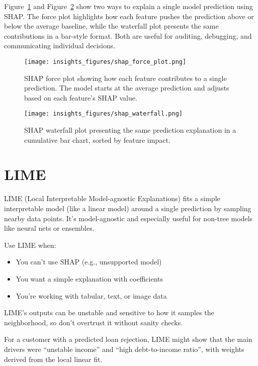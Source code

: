 \documentclass[12pt,openany, draft]{book}
\begin{document}
Figure~\ref{fig:shap-force} and Figure~\ref{fig:shap-waterfall} show two ways to explain a single model prediction using SHAP. The force plot highlights how each feature pushes the prediction above or below the average baseline, while the waterfall plot presents the same contributions in a bar-style format. Both are useful for auditing, debugging, and communicating individual decisions.

\begin{figure}[H]
    \centering
    \texttt{[image: insights\_figures/shap\_force\_plot.png]}
    \caption{SHAP force plot showing how each feature contributes to a single prediction. The model starts at the average prediction and adjusts based on each feature’s SHAP value.}
    \label{fig:shap-force}
\end{figure}

\begin{figure}[H]
    \centering
    \texttt{[image: insights\_figures/shap\_waterfall.png]}
    \caption{SHAP waterfall plot presenting the same prediction explanation in a cumulative bar chart, sorted by feature impact.}
    \label{fig:shap-waterfall}
\end{figure}



\section{LIME}

LIME (Local Interpretable Model-agnostic Explanations) fits a simple interpretable model (like a linear model) around a single prediction by sampling nearby data points. It’s model-agnostic and especially useful for non-tree models like neural nets or ensembles.

Use LIME when:
\begin{itemize}
  \item You can’t use SHAP (e.g., unsupported model)
  \item You want a simple explanation with coefficients
  \item You’re working with tabular, text, or image data
\end{itemize}

\begin{notebox}
LIME’s outputs can be unstable and sensitive to how it samples the neighborhood, so don’t overtrust it without sanity checks.
\end{notebox}

\begin{examplebox}
For a customer with a predicted loan rejection, LIME might show that the main drivers were ``unstable income'' and ``high debt-to-income ratio'', with weights derived from the local linear fit.
\end{examplebox}
\end{document}
